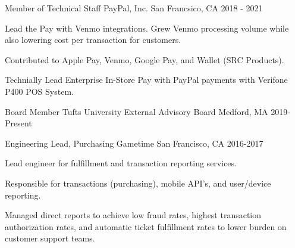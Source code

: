 
\begin{cventries}

  \cventry
    {Member of Technical Staff} %
    {PayPal, Inc.} %
    {San Francsico, CA} %
    {2018 - 2021} %
    {
      \begin{cvitems} %
        \item {Lead the Pay with Venmo integrations. Grew Venmo processing volume while also lowering cost per transaction for customers.}
        \item {Contributed to Apple Pay, Venmo, Google Pay, and Wallet (SRC Products).}
        \item {Technially Lead Enterprise In-Store Pay with PayPal payments with Verifone P400 POS System.}
      \end{cvitems}
    }

  \cventry
    {Board Member} %
    {Tufts University External Advisory Board} %
    {Medford, MA} %
    {2019-Present} %
    {
      \begin{cvitems} %
      \end{cvitems}
    }

  \cventry
    {Engineering Lead, Purchasing} %
    {Gametime} %
    {San Francisco, CA} %
    {2016-2017} %
    {
      \begin{cvitems} %
        \item {Lead engineer for fulfillment and transaction reporting services.}
        \item {Responsible for transactions (purchasing), mobile API's, and user/device reporting.}
        \item {Managed direct reports to achieve low fraud rates, highest transaction authorization rates, and automatic ticket fulfillment rates to lower burden on customer support teams.}
      \end{cvitems}
    }


\end{cventries}
